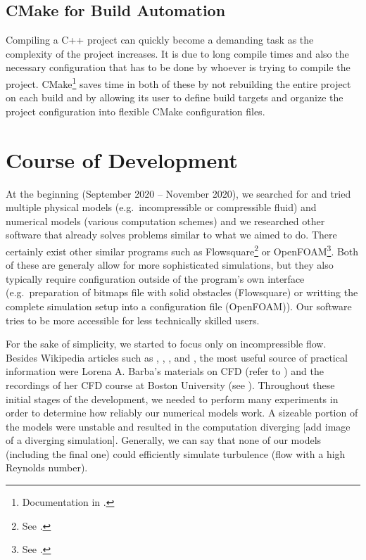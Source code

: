 \documentclass[11pt,a4paper,twoside,openright]{report}
\begin{document}
\subsection{CMake for Build Automation}
Compiling a C++ project can quickly become a demanding task as the complexity of the project increases. It is due to long compile times and also the necessary configuration that has to be done by whoever is trying to compile the project. CMake\footnote{Documentation in \cite{cmakedoc}.} saves time in both of these by not rebuilding the entire project on each build and by allowing its user to define build targets and organize the project configuration into flexible CMake configuration files.

\section{Course of Development}
At the beginning (September 2020 -- November 2020), we searched for and tried multiple physical models (e.g.\ incompressible or compressible fluid) and numerical models (various computation schemes) and we researched other software that already solves problems similar to what we aimed to do. There certainly exist other similar programs such as Flowsquare\footnote{See \cite{Flowsquare}.} or OpenFOAM\footnote{See \cite{OpenFOAM}.}. Both of these are generaly allow for more sophisticated simulations, but they also typically require configuration outside of the program's own interface (e.g.\ preparation of bitmaps file with solid obstacles (Flowsquare) or writting the complete simulation setup into a configuration file (OpenFOAM)). Our software tries to be more accessible for less technically skilled users.

For the sake of simplicity, we started to focus only on incompressible flow. Besides Wikipedia articles such as \cite{WikiNavierStokes}, \cite{WikiJacobi}, \cite{WikiGaussSeidel}, and \cite{WikiSOR}, the most useful source of practical information were Lorena A. Barba's materials on CFD (refer to \cite{CFDpython}) and the recordings of her CFD course at Boston University (see \cite{BarbaCourse}). Throughout these initial stages of the development, we needed to perform many experiments in order to determine how reliably our numerical models work. A sizeable portion of the models were unstable and resulted in the computation diverging [add image of a diverging simulation]. Generally, we can say that none of our models (including the final one) could efficiently simulate turbulence (flow with a high Reynolds number).
\end{document}
